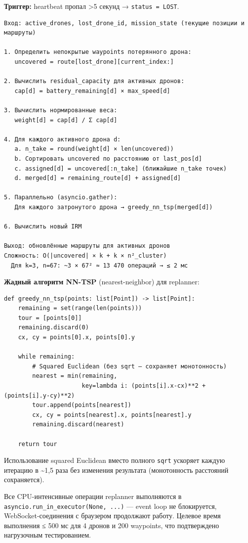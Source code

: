 \textbf{Триггер:} heartbeat пропал \textgreater5 секунд → \texttt{status\ =\ LOST}.

\begin{verbatim}
Вход: active_drones, lost_drone_id, mission_state (текущие позиции и маршруты)

1. Определить непокрытые waypoints потерянного дрона:
   uncovered = route[lost_drone][current_index:]

2. Вычислить residual_capacity для активных дронов:
   cap[d] = battery_remaining[d] × max_speed[d]

3. Вычислить нормированные веса:
   weight[d] = cap[d] / Σ cap[d]

4. Для каждого активного дрона d:
   a. n_take = round(weight[d] × len(uncovered))
   b. Сортировать uncovered по расстоянию от last_pos[d]
   c. assigned[d] = uncovered[:n_take] (ближайшие n_take точек)
   d. merged[d] = remaining_route[d] + assigned[d]

5. Параллельно (asyncio.gather):
   Для каждого затронутого дрона → greedy_nn_tsp(merged[d])

6. Вычислить новый IRM

Выход: обновлённые маршруты для активных дронов
Сложность: O(|uncovered| × k + k × n²_cluster)
  Для k=3, n=67: ~3 × 67² ≈ 13 470 операций → ≤ 2 мс
\end{verbatim}

\textbf{Жадный алгоритм NN-TSP} (nearest-neighbor) для replanner:

\begin{verbatim}
def greedy_nn_tsp(points: list[Point]) -> list[Point]:
    remaining = set(range(len(points)))
    tour = [points[0]]
    remaining.discard(0)
    cx, cy = points[0].x, points[0].y
    
    while remaining:
        # Squared Euclidean (без sqrt — сохраняет монотонность)
        nearest = min(remaining,
                      key=lambda i: (points[i].x-cx)**2 + (points[i].y-cy)**2)
        tour.append(points[nearest])
        cx, cy = points[nearest].x, points[nearest].y
        remaining.discard(nearest)
    
    return tour
\end{verbatim}

Использование squared Euclidean вместо полного \texttt{sqrt} ускоряет каждую итерацию в \textasciitilde1,5 раза без изменения результата (монотонность расстояний сохраняется).

Все CPU-интенсивные операции replanner выполняются в \texttt{asyncio.run\_in\_executor(None,\ ...)} --- event loop не блокируется, WebSocket-соединения с браузером продолжают работу. Целевое время выполнения ≤ 500 мс для 4 дронов и 200 waypoints, что подтверждено нагрузочным тестированием.

